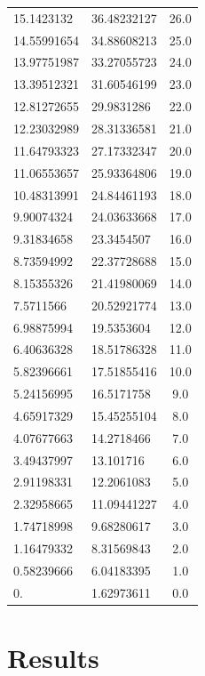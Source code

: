 \begin{table}
\begin{tabular}{ |l|l|c| }
        15.1423132 & 36.48232127 & 26.0 \\
        14.55991654 & 34.88608213 & 25.0 \\
        13.97751987 & 33.27055723 & 24.0 \\
        13.39512321 & 31.60546199 & 23.0 \\
        12.81272655 & 29.9831286 & 22.0 \\
        12.23032989 & 28.31336581 & 21.0 \\
        11.64793323 & 27.17332347 & 20.0 \\
        11.06553657 & 25.93364806 & 19.0 \\
        10.48313991 & 24.84461193 & 18.0 \\
        9.90074324 & 24.03633668 & 17.0 \\
        9.31834658 & 23.3454507 & 16.0 \\
        8.73594992 & 22.37728688 & 15.0 \\
        8.15355326 & 21.41980069 & 14.0 \\
        7.5711566 & 20.52921774 & 13.0 \\
        6.98875994 & 19.5353604 & 12.0 \\
        6.40636328 & 18.51786328 & 11.0 \\
        5.82396661 & 17.51855416 & 10.0 \\
        5.24156995 & 16.5171758 & 9.0 \\
        4.65917329 & 15.45255104 & 8.0 \\
        4.07677663 & 14.2718466 & 7.0 \\
        3.49437997 & 13.101716 & 6.0 \\
        2.91198331 & 12.2061083 & 5.0 \\
        2.32958665 & 11.09441227 & 4.0 \\
        1.74718998 & 9.68280617 & 3.0 \\
        1.16479332 & 8.31569843 & 2.0 \\
        0.58239666 & 6.04183395 & 1.0 \\
        0. & 1.62973611 & 0.0 \\
        \hline
    \end{tabular}
\end{table}



\section{Results}

